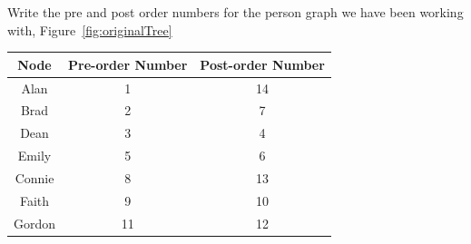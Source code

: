\begin{Exercise}[title={Pre- and Post-order numbers}, label={ex:pre_post2}]

    Write the pre and post order numbers for the person graph we have been working with, Figure~\ref{fig:originalTree}

\end{Exercise}

\begin{Answer}[ref={ex:pre_post2}]

    \begin{center}
        \begin{tabular}{c|c|c}
            Node   & Pre-order Number & Post-order Number \\
            \hline
            Alan   & 1                & 14                \\
            Brad   & 2                & 7                 \\
            Dean   & 3                & 4                 \\
            Emily  & 5                & 6                 \\
            Connie & 8                & 13                \\
            Faith  & 9                & 10                \\
            Gordon & 11               & 12                \\
        \end{tabular}
    \end{center}

\end{Answer}
